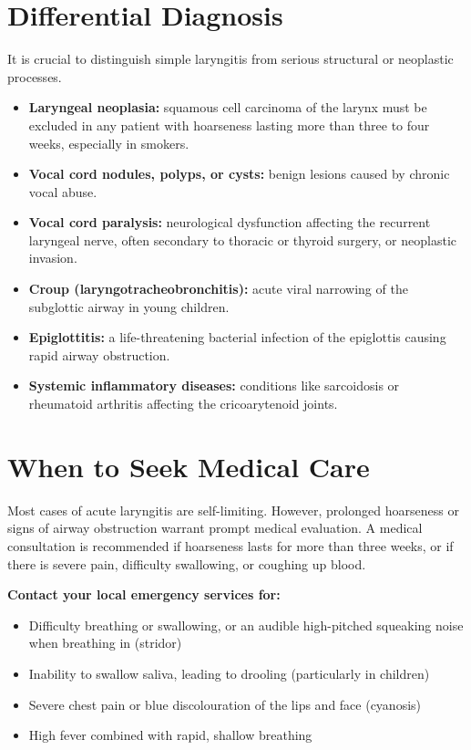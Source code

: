 \section*{Differential Diagnosis}
It is crucial to distinguish simple laryngitis from serious structural or neoplastic processes.
\begin{itemize}
    \item \textbf{Laryngeal neoplasia:} squamous cell carcinoma of the larynx must be excluded in any patient with hoarseness lasting more than three to four weeks, especially in smokers.
    \item \textbf{Vocal cord nodules, polyps, or cysts:} benign lesions caused by chronic vocal abuse.
    \item \textbf{Vocal cord paralysis:} neurological dysfunction affecting the recurrent laryngeal nerve, often secondary to thoracic or thyroid surgery, or neoplastic invasion.
    \item \textbf{Croup (laryngotracheobronchitis):} acute viral narrowing of the subglottic airway in young children.
    \item \textbf{Epiglottitis:} a life-threatening bacterial infection of the epiglottis causing rapid airway obstruction.
    \item \textbf{Systemic inflammatory diseases:} conditions like sarcoidosis or rheumatoid arthritis affecting the cricoarytenoid joints.
\end{itemize}

\section*{When to Seek Medical Care}
Most cases of acute laryngitis are self-limiting. However, prolonged hoarseness or signs of airway obstruction warrant prompt medical evaluation. A medical consultation is recommended if hoarseness lasts for more than three weeks, or if there is severe pain, difficulty swallowing, or coughing up blood.

\textbf{Contact your local emergency services for:}
\begin{itemize}
    \item Difficulty breathing or swallowing, or an audible high-pitched squeaking noise when breathing in (stridor)
    \item Inability to swallow saliva, leading to drooling (particularly in children)
    \item Severe chest pain or blue discolouration of the lips and face (cyanosis)
    \item High fever combined with rapid, shallow breathing
\end{itemize}

